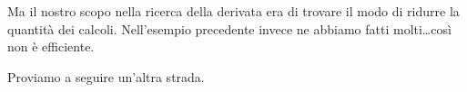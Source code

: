 \begin{esempio}
% 
\end{esempio}
Ma il nostro scopo nella ricerca della derivata era di trovare il modo 
di ridurre la quantità dei calcoli. Nell'esempio precedente invece ne 
abbiamo fatti molti\dots così non è efficiente.

Proviamo a seguire un'altra strada.

